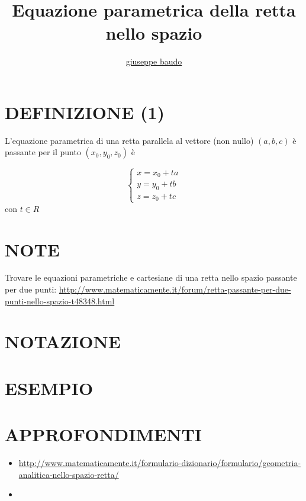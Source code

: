 \documentclass[a4paper,10pt]{article}
\title{Equazione parametrica della retta nello spazio}
\author{\href{http://www.baudo.hol.es}{giuseppe baudo}}
\begin{document}
\maketitle

\section{DEFINIZIONE (1)}
L'equazione parametrica di una retta parallela al vettore (non nullo) $(a,b,c)$ è passante per il punto $(x_0,y_0,z_0)$ è

 \begin{equation}
   \begin{cases}
   x=x_0 + ta \\
   y=y_0 + tb \\
   z=z_0 + tc
   \end{cases}
\end{equation}
con $t \in R$

\section{NOTE}
Trovare le equazioni parametriche e cartesiane di una retta nello spazio passante per due punti: 
\url{http://www.matematicamente.it/forum/retta-passante-per-due-punti-nello-spazio-t48348.html}

\section{NOTAZIONE}

\section{ESEMPIO}

\section{APPROFONDIMENTI}
\begin{itemize}
 \item \url{http://www.matematicamente.it/formulario-dizionario/formulario/geometria-analitica-nello-spazio-retta/}
 \item \url{}
\end{itemize}
\end{document}

